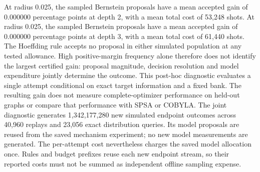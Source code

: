 {At radius 0.025, the sampled Bernstein proposals have a mean accepted gain of 0.000000 percentage points at depth 2, with a mean total cost of 53,248 shots.
At radius 0.025, the sampled Bernstein proposals have a mean accepted gain of 0.000000 percentage points at depth 3, with a mean total cost of 61,440 shots.
The Hoeffding rule accepts no proposal in either simulated population at any tested allowance.
High positive-margin frequency alone therefore does not identify the largest certified gain: proposal magnitude, decision resolution and model expenditure jointly determine the outcome. This post-hoc diagnostic evaluates a single attempt conditional on exact target information and a fixed bank. The resulting gain does not measure complete-optimizer performance on held-out graphs or compare that performance with SPSA or COBYLA.
The joint diagnostic generates 1,342,177,280 new simulated endpoint outcomes across 40,960 replays and 23,056 exact distribution queries. Its model proposals are reused from the saved mechanism experiment; no new model measurements are generated. The per-attempt cost nevertheless charges the saved model allocation once. Rules and budget prefixes reuse each new endpoint stream, so their reported costs must not be summed as independent offline sampling expense.
}
